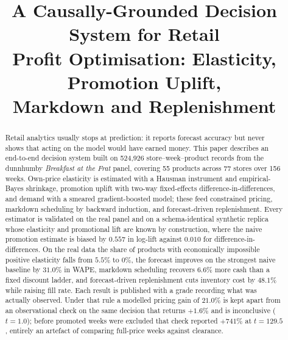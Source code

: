 \documentclass[conference,a4paper]{IEEEtran}
\begin{document}
\title{A Causally-Grounded Decision System for Retail\\Profit Optimisation:
Elasticity, Promotion Uplift,\\Markdown and Replenishment}

\author{
}

\maketitle

\begin{abstract}
Retail analytics usually stops at prediction: it reports forecast accuracy but
never shows that acting on the model would have earned money. This paper
describes an end-to-end decision system built on 524{,}926 store--week--product
records from the dunnhumby \emph{Breakfast at the Frat} panel, covering 55
products across 77 stores over 156 weeks. Own-price elasticity is estimated with a
Hausman instrument and empirical-Bayes shrinkage, promotion uplift with two-way
fixed-effects difference-in-differences, and demand with a smeared
gradient-boosted model; these feed constrained pricing, markdown scheduling by
backward induction, and forecast-driven replenishment. Every estimator is
validated on the real panel and on a schema-identical synthetic replica whose
elasticity and promotional lift are known by construction, where the naive
promotion estimate is biased by $0.557$ in log-lift against $0.010$ for
difference-in-differences. On the real data the
share of products with economically impossible positive elasticity falls from
$5.5\%$ to $0\%$, the forecast improves on the strongest naive baseline by
$31.0\%$ in WAPE, markdown scheduling recovers $6.6\%$ more cash than a fixed
discount ladder, and forecast-driven replenishment cuts inventory cost by
$48.1\%$ while raising fill rate. Each result is published with a grade
recording what was actually observed. Under that rule a modelled pricing gain of
$21.0\%$ is kept apart from an observational check on the same decision that
returns $+1.6\%$ and is inconclusive ($t=1.0$); before promoted weeks were
excluded that check reported $+741\%$ at $t=129.5$, entirely an artefact of
comparing full-price weeks against clearance.
\end{abstract}
\end{document}
